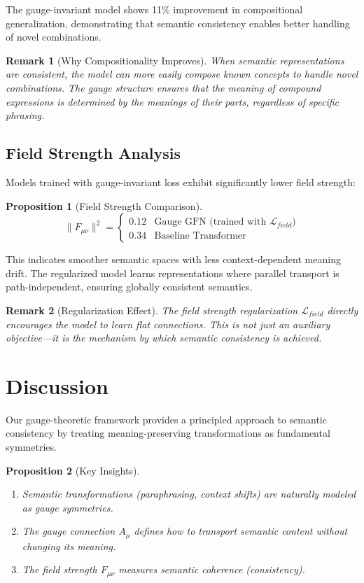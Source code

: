 \documentclass[12pt,letterpaper,twoside]{article}
\newtheorem{remarque}{Remark}[section]
\newtheorem{prop}{Proposition}[section]
\begin{document}
The gauge-invariant model shows 11\% improvement in compositional generalization, demonstrating that semantic consistency enables better handling of novel combinations.

\begin{remarque}[Why Compositionality Improves]
When semantic representations are consistent, the model can more easily compose known concepts to handle novel combinations. The gauge structure ensures that the meaning of compound expressions is determined by the meanings of their parts, regardless of specific phrasing.
\end{remarque}

\subsection{Field Strength Analysis}

Models trained with gauge-invariant loss exhibit significantly lower field strength:

\begin{prop}[Field Strength Comparison]
\[
\|F_{\mu\nu}\|^2 = 
\begin{cases}
0.12 & \text{Gauge GFN (trained with } \mathcal{L}_{field}\text{)} \\
0.34 & \text{Baseline Transformer}
\end{cases}
\]
\end{prop}

This indicates smoother semantic spaces with less context-dependent meaning drift. The regularized model learns representations where parallel transport is path-independent, ensuring globally consistent semantics.

\begin{remarque}[Regularization Effect]
The field strength regularization $\mathcal{L}_{field}$ directly encourages the model to learn flat connections. This is not just an auxiliary objective---it is the mechanism by which semantic consistency is achieved.
\end{remarque}

\section{Discussion}

Our gauge-theoretic framework provides a principled approach to semantic consistency by treating meaning-preserving transformations as fundamental symmetries.

\begin{prop}[Key Insights]
\begin{enumerate}
\item Semantic transformations (paraphrasing, context shifts) are naturally modeled as gauge symmetries.
\item The gauge connection $A_\mu$ defines how to transport semantic content without changing its meaning.
\item The field strength $F_{\mu\nu}$ measures semantic coherence (consistency).
\end{enumerate}
\end{prop}
\end{document}
